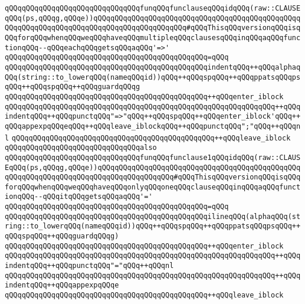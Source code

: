\verb|qQQqqQQqqQQqqQQqqQQqqQQqqQQqqQQqfunqQQqfunclauseqQQqidqQQq(raw::CLAUSEqQQq(ps,qQQqg,qQQqe))qQQqqQQqqQQqqQQqqQQqqQQqqQQqqQQqqQQqqQQqqQQqqQQqqQQqqQQqqQQqqQQqqQQqqQQqqQQqqQQqqQQqqQQqqQQq#qQQqThisqQQqversionqQQqisqQQqforqQQqwhenqQQqweqQQqhaveqQQqmultipleqQQqclausesqQQqinqQQqaqQQqfunctionqQQq--qQQqeachqQQqgetsqQQqaqQQq'=>'|\newline
\verb|qQQqqQQqqQQqqQQqqQQqqQQqqQQqqQQqqQQqqQQqqQQqqQQq=qQQq|\newline
\verb|qQQqqQQqqQQqqQQqqQQqqQQqqQQqqQQqqQQqqQQqqQQqqQQqindentqQQq++qQQqalphaqQQq(string::to_lowerqQQq(nameqQQqid))qQQq++qQQqspqQQq++qQQqppatsqQQqpsqQQq++qQQqspqQQq++qQQqguardqQQqg|\newline
\verb|qQQqqQQqqQQqqQQqqQQqqQQqqQQqqQQqqQQqqQQqqQQqqQQq++qQQqenter_iblock|\newline
\verb|qQQqqQQqqQQqqQQqqQQqqQQqqQQqqQQqqQQqqQQqqQQqqQQqqQQqqQQqqQQqqQQq++qQQqindentqQQq++qQQqpunctqQQq"=>"qQQq++qQQqspqQQq++qQQqenter_iblock'qQQq++qQQqappexpqQQqeqQQq++qQQqleave_iblockqQQq++qQQqpunctqQQq";"qQQq++qQQqnl|\newline
\verb|qQQqqQQqqQQqqQQqqQQqqQQqqQQqqQQqqQQqqQQqqQQqqQQq++qQQqleave_iblock|\newline
\newline
\verb|qQQqqQQqqQQqqQQqqQQqqQQqqQQqqQQqalso|\newline
\verb|qQQqqQQqqQQqqQQqqQQqqQQqqQQqqQQqfunqQQqfunclause1qQQqidqQQq(raw::CLAUSEqQQq(ps,qQQqg,qQQqe))qQQqqQQqqQQqqQQqqQQqqQQqqQQqqQQqqQQqqQQqqQQqqQQqqQQqqQQqqQQqqQQqqQQqqQQqqQQqqQQqqQQqqQQq#qQQqThisqQQqversionqQQqisqQQqforqQQqwhenqQQqweqQQqhaveqQQqonlyqQQqoneqQQqclauseqQQqinqQQqaqQQqfunctionqQQq--qQQqitqQQqgetsqQQqaqQQq'='|\newline
\verb|qQQqqQQqqQQqqQQqqQQqqQQqqQQqqQQqqQQqqQQqqQQqqQQq=qQQq|\newline
\verb|qQQqqQQqqQQqqQQqqQQqqQQqqQQqqQQqqQQqqQQqqQQqqQQqilineqQQq(alphaqQQq(string::to_lowerqQQq(nameqQQqid))qQQq++qQQqspqQQq++qQQqppatsqQQqpsqQQq++qQQqspqQQq++qQQqguardqQQqg)|\newline
\verb|qQQqqQQqqQQqqQQqqQQqqQQqqQQqqQQqqQQqqQQqqQQqqQQq++qQQqenter_iblock|\newline
\verb|qQQqqQQqqQQqqQQqqQQqqQQqqQQqqQQqqQQqqQQqqQQqqQQqqQQqqQQqqQQqqQQq++qQQqindentqQQq++qQQqpunctqQQq"="qQQq++qQQqnl|\newline
\verb|qQQqqQQqqQQqqQQqqQQqqQQqqQQqqQQqqQQqqQQqqQQqqQQqqQQqqQQqqQQqqQQq++qQQqindentqQQq++qQQqappexpqQQqe|\newline
\verb|qQQqqQQqqQQqqQQqqQQqqQQqqQQqqQQqqQQqqQQqqQQqqQQq++qQQqleave_iblock|\newline

